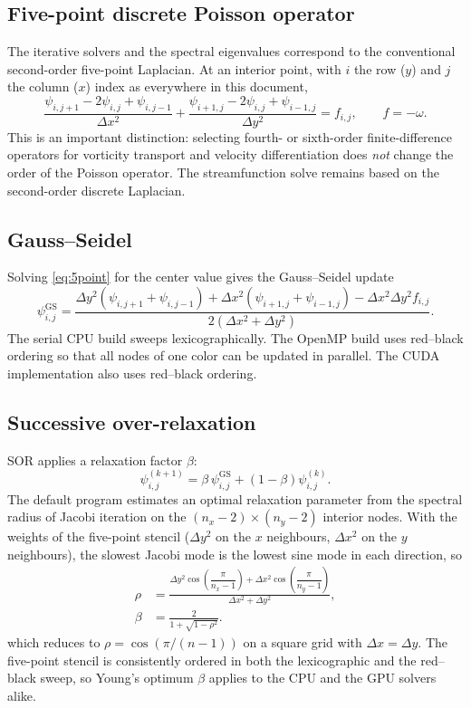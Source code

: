 \documentclass[11pt,a4paper]{article}
\newcommand{\dx}{\Delta x}
\newcommand{\dy}{\Delta y}
\begin{document}
\subsection{Five-point discrete Poisson operator}

The iterative solvers and the spectral eigenvalues correspond to the conventional second-order five-point Laplacian.  At an interior point, with $i$ the row ($y$) and $j$ the column ($x$) index as everywhere in this document,
\begin{equation}
\frac{\psi_{i,j+1}-2\psi_{i,j}+\psi_{i,j-1}}{\dx^2}
+
\frac{\psi_{i+1,j}-2\psi_{i,j}+\psi_{i-1,j}}{\dy^2}
=f_{i,j},
\qquad f=-\omega.
\label{eq:5point}
\end{equation}
This is an important distinction: selecting fourth- or sixth-order finite-difference operators for vorticity transport and velocity differentiation does \emph{not} change the order of the Poisson operator.  The streamfunction solve remains based on the second-order discrete Laplacian.

\subsection{Gauss--Seidel}

Solving \cref{eq:5point} for the center value gives the Gauss--Seidel update
\begin{equation}
\psi_{i,j}^{\mathrm{GS}}
=
\frac{
\dy^2(\psi_{i,j+1}+\psi_{i,j-1})
+\dx^2(\psi_{i+1,j}+\psi_{i-1,j})
-\dx^2\dy^2 f_{i,j}
}{2(\dx^2+\dy^2)}.
\label{eq:gs}
\end{equation}
The serial CPU build sweeps lexicographically.  The OpenMP build uses red--black ordering so that all nodes of one color can be updated in parallel.  The CUDA implementation also uses red--black ordering.

\subsection{Successive over-relaxation}

SOR applies a relaxation factor $\beta$:
\begin{equation}
\psi_{i,j}^{(k+1)}
=\beta\,\psi_{i,j}^{\mathrm{GS}}
+(1-\beta)\psi_{i,j}^{(k)}.
\label{eq:sor}
\end{equation}
The default program estimates an optimal relaxation parameter from the spectral radius of Jacobi iteration on the $(n_x-2)\times(n_y-2)$ interior nodes.  With the weights of the five-point stencil ($\Delta y^2$ on the $x$ neighbours, $\Delta x^2$ on the $y$ neighbours), the slowest Jacobi mode is the lowest sine mode in each direction, so
\begin{align}
\rho &= \frac{\Delta y^2\cos\left(\dfrac{\pi}{n_x-1}\right)
+\Delta x^2\cos\left(\dfrac{\pi}{n_y-1}\right)}{\Delta x^2+\Delta y^2},\\
\beta &= \frac{2}{1+\sqrt{1-\rho^2}}.
\label{eq:sor-beta}
\end{align}
which reduces to $\rho=\cos(\pi/(n-1))$ on a square grid with $\Delta x=\Delta y$.  The five-point stencil is consistently ordered in both the lexicographic and the red--black sweep, so Young's optimum $\beta$ applies to the CPU and the GPU solvers alike.
\end{document}
